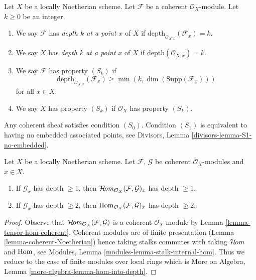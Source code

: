 \begin{definition}
\label{definition-depth}
Let $X$ be a locally Noetherian scheme.
Let $\mathcal{F}$ be a coherent $\mathcal{O}_X$-module.
Let $k \geq 0$ be an integer.
\begin{enumerate}
\item We say $\mathcal{F}$ has {\it depth $k$ at a point}
$x$ of $X$ if $\text{depth}_{\mathcal{O}_{X, x}}(\mathcal{F}_x) = k$.
\item We say $X$ has {\it depth $k$ at a point} $x$ of $X$ if
$\text{depth}(\mathcal{O}_{X, x}) = k$.
\item We say $\mathcal{F}$ has property {\it $(S_k)$} if
$$
\text{depth}_{\mathcal{O}_{X, x}}(\mathcal{F}_x)
\geq \min(k, \dim(\text{Supp}(\mathcal{F}_x)))
$$
for all $x \in X$.
\item We say $X$ has property {\it $(S_k)$} if $\mathcal{O}_X$ has
property $(S_k)$.
\end{enumerate}
\end{definition}

\noindent
Any coherent sheaf satisfies condition $(S_0)$.
Condition $(S_1)$ is equivalent to having no embedded associated
points, see Divisors, Lemma \ref{divisors-lemma-S1-no-embedded}.

\begin{lemma}
\label{lemma-hom-into-depth}
Let $X$ be a locally Noetherian scheme. Let $\mathcal{F}$, $\mathcal{G}$
be coherent $\mathcal{O}_X$-modules and $x \in X$.
\begin{enumerate}
\item If $\mathcal{G}_x$ has depth $\geq 1$, then
$\mathop{\mathcal{H}\!\mathit{om}}\nolimits_{\mathcal{O}_X}(\mathcal{F}, \mathcal{G})_x$
has depth $\geq 1$.
\item If $\mathcal{G}_x$ has depth $\geq 2$, then
$\mathop{\mathrm{Hom}}\nolimits_{\mathcal{O}_X}(\mathcal{F}, \mathcal{G})_x$ has depth $\geq 2$.
\end{enumerate}
\end{lemma}

\begin{proof}
Observe that $\mathop{\mathcal{H}\!\mathit{om}}\nolimits_{\mathcal{O}_X}(\mathcal{F}, \mathcal{G})$ is
a coherent $\mathcal{O}_X$-module by Lemma \ref{lemma-tensor-hom-coherent}.
Coherent modules are of finite presentation
(Lemma \ref{lemma-coherent-Noetherian}) hence taking stalks commutes
with taking $\mathop{\mathcal{H}\!\mathit{om}}\nolimits$ and $\mathop{\mathrm{Hom}}\nolimits$, see
Modules, Lemma \ref{modules-lemma-stalk-internal-hom}.
Thus we reduce to the case of finite modules over local
rings which is More on Algebra, Lemma \ref{more-algebra-lemma-hom-into-depth}.
\end{proof}

